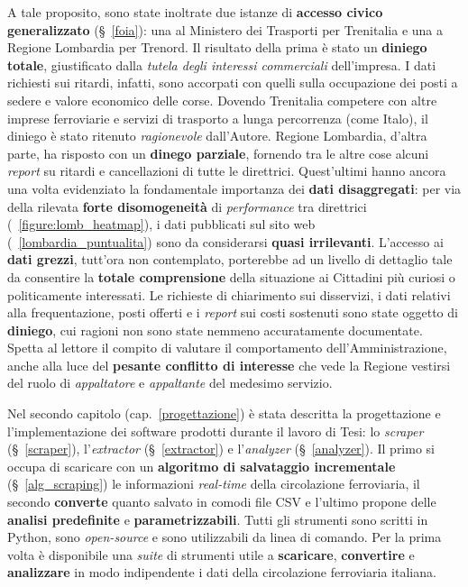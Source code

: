\documentclass[12pt,italian]{report}
\begin{document}
A tale proposito, sono state inoltrate due istanze di \textbf{accesso
    civico generalizzato} (\S~\ref{foia}): una al Ministero dei
Trasporti per Trenitalia e una a Regione Lombardia per Trenord.  Il
risultato della prima è stato un \textbf{diniego totale}, giustificato
dalla \textit{tutela degli interessi commerciali} dell'impresa.  I
dati richiesti sui ritardi, infatti, sono accorpati con quelli sulla
occupazione dei posti a sedere e valore economico delle corse.
Dovendo Trenitalia competere con altre imprese ferroviarie e servizi
di trasporto a lunga percorrenza (come Italo), il diniego è stato
ritenuto \textit{ragionevole} dall'Autore.  Regione Lombardia, d'altra
parte, ha risposto con un \textbf{dinego parziale}, fornendo tra le
altre cose alcuni \textit{report} su ritardi e cancellazioni di tutte
le direttrici.  Quest'ultimi hanno ancora una volta evidenziato la
fondamentale importanza dei \textbf{dati disaggregati}: per via della
rilevata \textbf{forte disomogeneità} di \textit{performance} tra
direttrici (\figurename~\ref{figure:lomb_heatmap}), i dati pubblicati
sul sito web (\figurename~\ref{lombardia_puntualita}) sono da
considerarsi \textbf{quasi irrilevanti}.  L'accesso ai \textbf{dati
    grezzi}, tutt'ora non contemplato, porterebbe ad un livello di
dettaglio tale da consentire la \textbf{totale comprensione} della
situazione ai Cittadini più curiosi o politicamente interessati.  Le
richieste di chiarimento sui disservizi, i dati relativi alla
frequentazione, posti offerti e i \textit{report} sui costi sostenuti
sono state oggetto di \textbf{diniego}, cui ragioni non sono state
nemmeno accuratamente documentate.  Spetta al lettore il compito di
valutare il comportamento dell'Amministrazione, anche alla luce del
\textbf{pesante conflitto di interesse} che vede la Regione vestirsi
del ruolo di \textit{appaltatore} e \textit{appaltante} del medesimo
servizio.

Nel secondo capitolo (cap.\@~\ref{progettazione}) è stata descritta la
progettazione e l'implementazione dei software prodotti durante il
lavoro di Tesi: lo \textit{scraper} (\S~\ref{scraper}),
l'\textit{extractor} (\S~\ref{extractor}) e l'\textit{analyzer}
(\S~\ref{analyzer}).  Il primo si occupa di scaricare con un
\textbf{algoritmo di salvataggio incrementale} (\S~\ref{alg_scraping})
le informazioni \textit{real-time} della circolazione ferroviaria, il
secondo \textbf{converte} quanto salvato in comodi file CSV e l’ultimo
propone delle \textbf{analisi predefinite} e
\textbf{parametrizzabili}.  Tutti gli strumenti sono scritti in
Python, sono \textit{open-source} e sono utilizzabili da linea di
comando.  Per la prima volta è disponibile una \textit{suite} di
strumenti utile a \textbf{scaricare}, \textbf{convertire} e
\textbf{analizzare} in modo indipendente i dati della circolazione
ferroviaria italiana.
\end{document}
